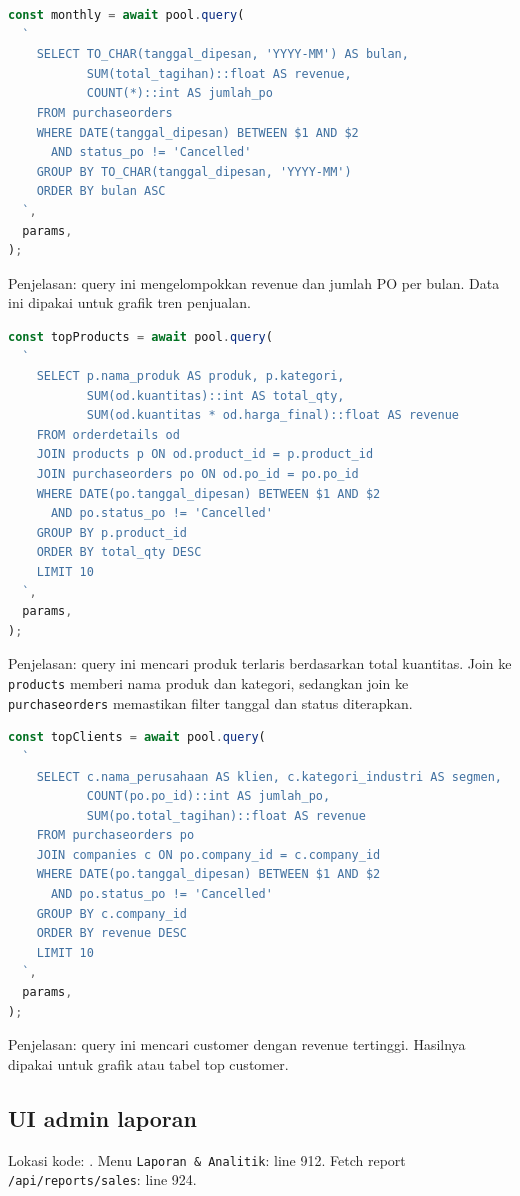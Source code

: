 \documentclass[11pt,a4paper]{article}
\begin{document}
\begin{lstlisting}[language=JavaScript]
const monthly = await pool.query(
  `
    SELECT TO_CHAR(tanggal_dipesan, 'YYYY-MM') AS bulan,
           SUM(total_tagihan)::float AS revenue,
           COUNT(*)::int AS jumlah_po
    FROM purchaseorders
    WHERE DATE(tanggal_dipesan) BETWEEN $1 AND $2
      AND status_po != 'Cancelled'
    GROUP BY TO_CHAR(tanggal_dipesan, 'YYYY-MM')
    ORDER BY bulan ASC
  `,
  params,
);
\end{lstlisting}

Penjelasan: query ini mengelompokkan revenue dan jumlah PO per bulan. Data ini dipakai untuk grafik tren penjualan.

\begin{lstlisting}[language=JavaScript]
const topProducts = await pool.query(
  `
    SELECT p.nama_produk AS produk, p.kategori,
           SUM(od.kuantitas)::int AS total_qty,
           SUM(od.kuantitas * od.harga_final)::float AS revenue
    FROM orderdetails od
    JOIN products p ON od.product_id = p.product_id
    JOIN purchaseorders po ON od.po_id = po.po_id
    WHERE DATE(po.tanggal_dipesan) BETWEEN $1 AND $2
      AND po.status_po != 'Cancelled'
    GROUP BY p.product_id
    ORDER BY total_qty DESC
    LIMIT 10
  `,
  params,
);
\end{lstlisting}

Penjelasan: query ini mencari produk terlaris berdasarkan total kuantitas. Join ke \texttt{products} memberi nama produk dan kategori, sedangkan join ke \texttt{purchaseorders} memastikan filter tanggal dan status diterapkan.

\begin{lstlisting}[language=JavaScript]
const topClients = await pool.query(
  `
    SELECT c.nama_perusahaan AS klien, c.kategori_industri AS segmen,
           COUNT(po.po_id)::int AS jumlah_po,
           SUM(po.total_tagihan)::float AS revenue
    FROM purchaseorders po
    JOIN companies c ON po.company_id = c.company_id
    WHERE DATE(po.tanggal_dipesan) BETWEEN $1 AND $2
      AND po.status_po != 'Cancelled'
    GROUP BY c.company_id
    ORDER BY revenue DESC
    LIMIT 10
  `,
  params,
);
\end{lstlisting}

Penjelasan: query ini mencari customer dengan revenue tertinggi. Hasilnya dipakai untuk grafik atau tabel top customer.

\subsection*{UI admin laporan}
Lokasi kode: . Menu \texttt{Laporan \& Analitik}: line 912. Fetch report \texttt{/api/reports/sales}: line 924.
\end{document}
